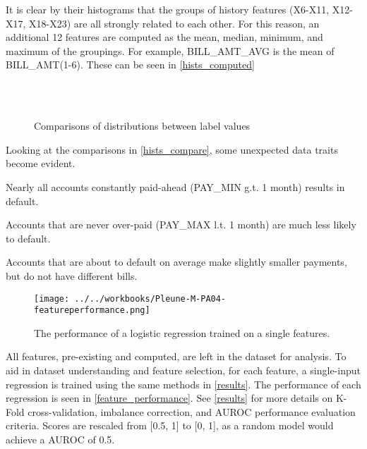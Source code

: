 \documentclass[conference]{IEEEtran}
\begin{document}
It is clear by their histograms that the groups of history features (X6-X11,
X12-X17, X18-X23) are all strongly related to each other. For this reason, an
additional 12 features are computed as the mean, median, minimum, and maximum
of the groupings. For example, BILL\_AMT\_AVG is the mean of BILL\_AMT(1-6).
These can be seen in \autoref{hists_computed}

\begin{figure}[ht]
	\centering
	\\
	\\
	\caption{Comparisons of distributions between label values}
	\label{hists_compare}
\end{figure}

Looking at the comparisons in \autoref{hists_compare}, some unexpected data
traits become evident.

\begin{IEEEitemize}
	\item Nearly all accounts constantly paid-ahead (PAY\_MIN g.t. 1 month) results in
	default.
	\item Accounts that are never over-paid (PAY\_MAX l.t. 1 month) are much less likely
	to default.
	\item Accounts that are about to default on average make slightly smaller payments,
	but do not have different bills.
\end{IEEEitemize}

\begin{figure}[ht]
	\texttt{[image: ../../workbooks/Pleune-M-PA04-featureperformance.png]}
	\caption{The performance of a logistic regression trained on a single features.}
	\label{feature_performance}
\end{figure}

All features, pre-existing and computed, are left in the dataset for analysis.
To aid in dataset understanding and feature selection, for each feature, a
single-input regression is trained using the same methods in \autoref{results}.
The performance of each regression is seen in \autoref{feature_performance}.
See \autoref{results} for more details on K-Fold cross-validation, imbalance
correction, and AUROC performance evaluation criteria. Scores are rescaled from
	[0.5, 1] to [0, 1], as a random model would achieve a AUROC of 0.5.
\end{document}
